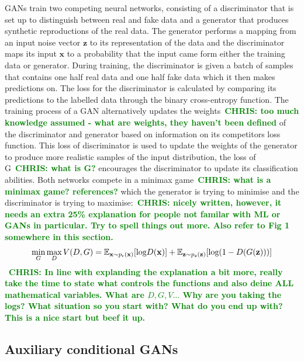 \documentclass[12pt]{iopart}
\newcommand{\chris}[1]{\textbf{\textcolor{green}{CHRIS: #1}}}
\begin{document}
%
\acp{GAN} train two competing neural networks, consisting of a discriminator
that is set up to distinguish between real and fake data and a generator that
produces synthetic reproductions of the real data. The generator performs a
mapping from an input noise vector $\mathbf{z}$ to its representation of the
data and the discriminator maps its input $\mathbf{x}$ to a probability that
the input came form either the training data or generator.  During training,
the discriminator is given a batch of samples that contains one half real data
and one half fake data which it then makes predictions on. The loss for the
discriminator is calculated by comparing its predictions to the labelled data
through the binary cross-entropy function. The training process of a \ac{GAN}
alternatively updates the weights~\chris{too much knowledge assumed - what are
weights, they haven't been defined} of the discriminator and generator based on
information on its competitors loss function. This loss of discriminator is
used to update the weights of the generator to produce more realistic samples
of the input distribution, the loss of G~\chris{what is G?} encourages the
discriminator to update its classification abilities. Both networks compete in
a minimax game~\chris{what is a minimax game? references?} which the generator
is trying to minimise and the discriminator is trying to
maximise:~\chris{nicely written, however, it needs an extra 25\% explanation
for people not familar with ML or GANs in particular. Try to spell things out
more. Also refer to Fig 1 somewhere in this section.}
%
\begin{equation}
\mathop{\text{min}}_{G}  \mathop{\text{max}}_{D} V(D,G) = \mathbb{E}_{\mathbf{x} \sim p_{\text{r}}(\mathbf{x})} [\text{log} D(\mathbf{x})] \\ + \mathbb{E}_{\mathbf{z} \sim p_{\text{z}}(\mathbf{z})} [\text{log}(1-D(G(\mathbf{z})))]
\label{equation:GANloss}
\end{equation}
%
~\chris{In line with explanding the explanation a bit more, really take the time
to state what controls the functions and also deine ALL mathematical variables.
What are $D, G, V\ldots$ Why are you taking the logs? What situation so you
start with? What do you end up with? This is a nice start but beef it up.}

\subsection{Auxiliary conditional GANs}
\end{document}
